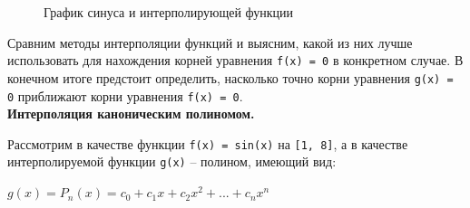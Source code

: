 \documentclass{article}
\begin{document}
				\begin{figure} 
					\caption{График синуса и интерполирующей функции}
					\label{fig:dix1}
				\end{figure}
			
				Сравним методы интерполяции функций и выясним, какой из них лучше использовать для нахождения корней уравнения \texttt{f(x) = 0} в конкретном случае. В конечном итоге предстоит определить, насколько точно корни уравнения \texttt{g(x) = 0} приближают корни уравнения \texttt{f(x) = 0}.\\
				
				\textbf{Интерполяция каноническим полиномом.}
				
				Рассмотрим в качестве функции \texttt{f(x) = sin(x)} на \texttt{[1, 8]}, а в качестве интерполируемой функции \texttt{g(x)} -- полином, имеющий вид: 
				
			\begin{center}	\texttt{$g(x) = P_n(x) = c_0 + c_1x + c_2x^2 + ... + c_nx^n$}
	\end{center}
	
\end{document}
